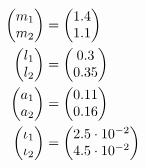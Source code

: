 \documentclass[pdftex,a4paper,11pt]{article}
\begin{document}
\begin{align*}
  \begin{pmatrix} m_1  \\ m_2   \end{pmatrix} & = \begin{pmatrix} 1.4               \\ 1.1  \end{pmatrix} \\
  \begin{pmatrix} l_1   \\ l_2   \end{pmatrix} & = \begin{pmatrix} 0.3               \\ 0.35 \end{pmatrix} \\
  \begin{pmatrix} a_1 \\ a_2 \end{pmatrix} & = \begin{pmatrix} 0.11              \\ 0.16 \end{pmatrix} \\
  \begin{pmatrix} \iota_1   \\ \iota_2   \end{pmatrix} & = \begin{pmatrix} 2.5 \cdot 10^{-2} \\ 4.5  \cdot 10^{-2} \end{pmatrix} 
\end{align*}
\end{document}
